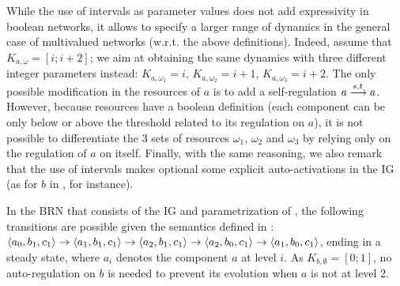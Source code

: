 While the use of intervals as parameter values does not add expressivity in boolean networks,
it allows to specify a larger range of dynamics in the general case of multivalued networks (w.r.t. the above definitions).
Indeed, assume that $K_{a,\omega} = [i ; i+2]$;
we aim at obtaining the same dynamics with three different integer parameters instead: $K_{a,\omega_1} = i$,  $K_{a,\omega_2} = i+1$, $K_{a,\omega_3} = i+2$.
The only possible modification in the resources of $a$ is to add a self-regulation $a \xrightarrow{s, t} a$.
However, because resources have a boolean definition
(each component can be only below or above the threshold related to its regulation on $a$),
it is not possible to differentiate the 3 sets of resources $\omega_1$, $\omega_2$ and $\omega_3$
by relying only on the regulation of $a$ on itself.
Finally, with the same reasoning, we also remark that the use of intervals makes optional some explicit auto-activations in the IG
(as for $b$ in , for instance).

\begin{example*}
In the BRN that consists of the IG and parametrization of , the following
transitions are possible given the semantics defined in :
$\mbox{$\langle a_0, b_1, c_1 \rangle$} \rightarrow \mbox{$\langle a_1, b_1, c_1 \rangle$} \rightarrow \mbox{$\langle a_2, b_1, c_1 \rangle$} \rightarrow
\mbox{$\langle a_2, b_0, c_1 \rangle$} \rightarrow \mbox{$\langle a_1, b_0, c_1 \rangle$}$,
ending in a steady state,
where $a_i$ denotes the component $a$ at level $i$.
As $K_{b,\emptyset} = [0 ; 1]$, no auto-regulation on $b$ is needed to prevent its evolution when $a$ is not at level $2$.
\end{example*}

